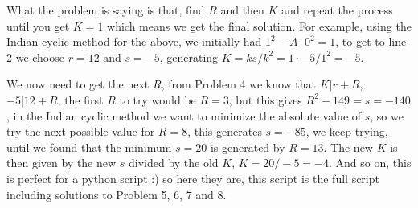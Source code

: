 \documentclass[aps,preprint,preprintnumbers,nofootinbib,showpacs,prd]{revtex4-1}
\begin{document}
What the problem is saying is that, find $R$ and then $K$ and repeat the process until you get $K=1$ which means we get the final solution. For example, using the Indian cyclic method for the above, we initially had $1^2 - A\cdot0^2 = 1$, to get to line 2 we choose $r = 12$ and $s = -5$, generating $K = ks/k^2 = 1\cdot-5/1^2 = -5$.

We now need to get the next $R$, from Problem 4 we know that $K|r+R$, $-5|12 + R$, the first $R$ to try would be $R=3$, but this gives $R^2 - 149 = s = -140$, in the Indian cyclic method we want to minimize the absolute value of $s$, so we try the next possible value for $R = 8$, this generates $s = -85$, we keep trying, until we found that the minimum $s = 20$ is generated by $R = 13$. The new $K$ is then given by the new $s$ divided by the old $K$, $K = 20/-5 = -4$. And so on, this is perfect for a python script :) so here they are, this script is the full script including solutions to Problem 5, 6, 7 and 8.
%
\end{document}
